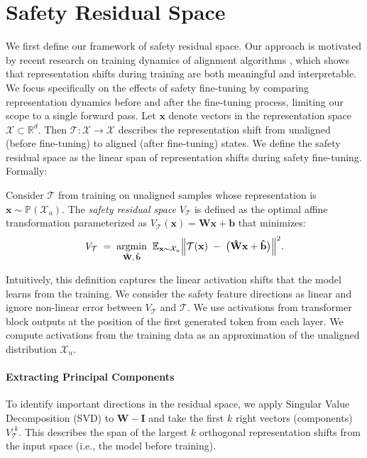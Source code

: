 \section{Safety Residual Space}
\label{sec:safety_residual}

We first define our framework of safety residual space. Our approach is motivated by recent research on training dynamics of alignment algorithms \cite{jain2024makes,lee2024mechanistic}, which shows that representation shifts during training are both meaningful and interpretable. We focus specifically on the effects of safety fine-tuning by comparing representation dynamics before and after the fine-tuning process, limiting our scope to a single forward pass. Let $\mathbf{x}$ denote vectors in the representation space $\mathcal{X} \subset \mathbb{R}^d$. Then $\mathcal{T}: \mathcal{X} \to \mathcal{X}$ describes the representation shift from unaligned (before fine-tuning) to aligned (after fine-tuning) states. We define the safety residual space as the linear span of representation shifts during safety fine-tuning. Formally:

\begin{definition}
    Consider $\mathcal{T}$ from training on unaligned samples whose representation is $\mathbf{x} \sim \mathbb{P}(\mathcal{X}_u)$.
    The \emph{safety residual space} $V_\mathcal{T}$ is defined as the optimal affine transformation parameterized as $V_\mathcal{T}(\mathbf{x}) = \mathbf{W} \mathbf{x} + \mathbf{b}$ that minimizes:
    \[
    V_\mathcal{T}
    \;=\;
    \underset{\mathbf{\hat{W}},\,\mathbf{\hat{b}}}{\mathrm{argmin}}
    \;\; 
    \mathbb{E}_{\mathbf{x} \sim \mathcal{X}_u}
    \Bigl\|\mathcal{T}(\mathbf{x}) \;-\; \bigl(\mathbf{\hat{W}}\mathbf{x} + \mathbf{\hat{b}}\bigr)\Bigr\|^2.
    \]
    \label{def:residual}
    \end{definition}
    

Intuitively, this definition captures the linear activation shifts that the model learns from the training. We consider the safety feature directions as linear and ignore non-linear error between $V_\mathcal{T}$ and $\mathcal{T}$. We use activations from transformer block outputs at the position of the first generated token from each layer. We compute activations from the training data as an approximation of the unaligned distribution $\mathcal{X}_u$.

\paragraph{Extracting Principal Components}
 To identify important directions in the residual space, we apply Singular Value Decomposition (SVD) to $\mathbf{W} - \mathbf{I}$ and take the first $k$ right vectors (components) $V^{:k}_\mathcal{T}$. This describes the span of the largest $k$ orthogonal representation shifts from the input space (i.e., the model before training). 

